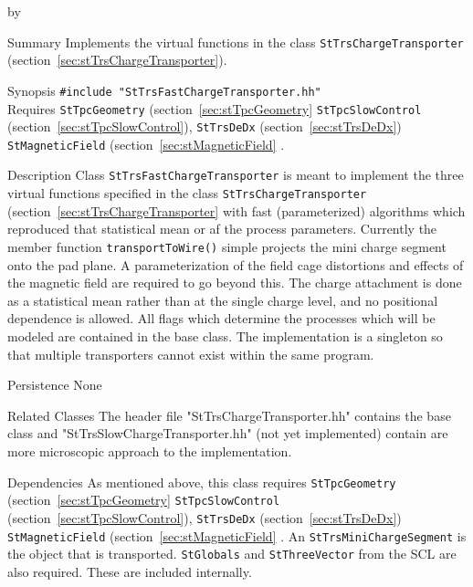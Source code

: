 \documentclass[twoside]{article}
\newcommand{\comp}[1]{\texttt{#1}}%
\newcommand{\entrylabel}[1]{\mbox{\textbf{{#1}}}\hfil}%
\newenvironment{entry}
{\begin{list}{}%
    {\renewcommand{\makelabel}{\entrylabel}%
     \setlength{\labelwidth}{90pt}%
     \setlength{\leftmargin}{\labelwidth}
     \advance\leftmargin by \labelsep%
      }%
    }%
  {\end{list}}
\newcommand{\Entrylabel}[1]%
{\raisebox{0pt}[1ex][0pt]{\makebox[\labelwidth][l]%
    {\parbox[t]{\labelwidth}{\hspace{0pt}\textbf{{#1}}}}}}
\newenvironment{Entry}%
{\renewcommand{\entrylabel}{\Entrylabel}\begin{entry}}%
  {\end{entry}}
\begin{document}
\begin{Entry}
\item[Summary]
  Implements the virtual functions in the class 
  \comp{StTrsChargeTransporter} (section~\ref{sec:stTrsChargeTransporter}).

\item[Synopsis]
  \verb+#include "StTrsFastChargeTransporter.hh"+\\
  Requires \comp{StTpcGeometry} (section~\ref{sec:stTpcGeometry} 
   \comp{StTpcSlowControl} 
  (section~\ref{sec:stTpcSlowControl}), 
  \comp{StTrsDeDx} (section~\ref{sec:stTrsDeDx}) 
   \comp{StMagneticField} (section~\ref{sec:stMagneticField} 
  .

\item[Description]
Class \comp{StTrsFastChargeTransporter} is meant to implement the three virtual
functions specified in the class \comp{StTrsChargeTransporter}
(section~\ref{sec:stTrsChargeTransporter} with fast (parameterized)
algorithms which reproduced that statistical mean or af the process
parameters.  Currently the member function \texttt{transportToWire()}
simple projects the mini charge segment onto the pad plane.  
A parameterization of the field cage distortions and effects of the
magnetic field are required to go beyond this.  The charge attachment
is done as a statistical mean rather than at the single charge level, and
no positional dependence is allowed.  All flags which determine
the processes which will be modeled are contained in the base class.
The implementation is a singleton  so that
multiple transporters cannot exist within the same program. 

\item[Persistence]
   None

\item[Related Classes]
The header file "StTrsChargeTransporter.hh" contains the base
class and "StTrsSlowChargeTransporter.hh" (not yet implemented)
contain are more microscopic approach to the implementation.

\item[Dependencies]
  As mentioned above, this class requires \comp{StTpcGeometry} 
  (section~\ref{sec:stTpcGeometry} 
   \comp{StTpcSlowControl} 
  (section~\ref{sec:stTpcSlowControl}), 
  \comp{StTrsDeDx} (section~\ref{sec:stTrsDeDx}) 
   \comp{StMagneticField} (section~\ref{sec:stMagneticField} 
  .  An \comp{StTrsMiniChargeSegment} is the
  object that is transported.
  \comp{StGlobals} and \comp{StThreeVector} 
  from the SCL are also required.   These are included internally.


\end{Entry}
\end{document}
